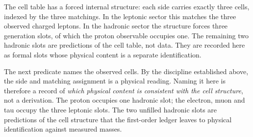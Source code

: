 \documentclass[11pt]{article}
\begin{document}
The cell table has a forced internal structure: each side carries
exactly three cells, indexed by the three matchings.  In the leptonic
sector this matches the three observed charged leptons.  In the
hadronic sector the structure forces three generation slots, of which
the proton observable occupies one.  The remaining two hadronic slots
are predictions of the cell table, not data.  They are recorded here as
formal slots whose physical content is a separate identification.


The next predicate names the observed cells.  By the discipline
established above, the side and matching assignment is a physical
reading.  Naming it here is therefore a record of \emph{which physical
content is consistent with the cell structure}, not a derivation.  The
proton occupies one hadronic slot; the electron, muon and tau occupy
the three leptonic slots.  The two unfilled hadronic slots are
predictions of the cell structure that the first-order ledger leaves to
physical identification against measured masses.
\end{document}
